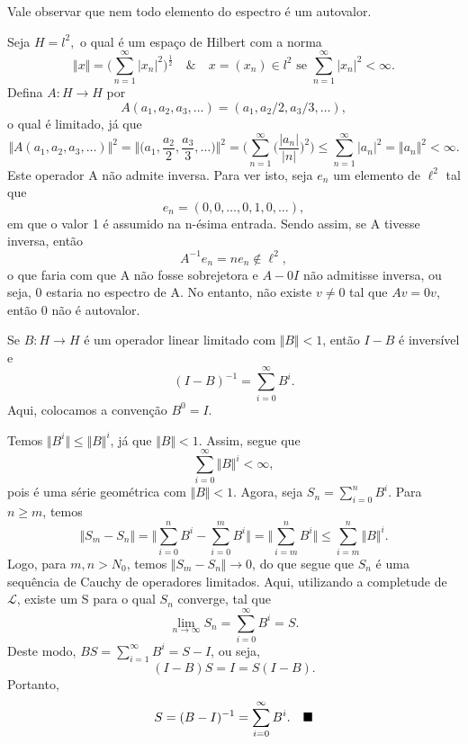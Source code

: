 \documentclass[measure_theory.tex]{subfiles}
\begin{document}
Vale observar que nem todo elemento do espectro é um autovalor.
\begin{example}
	Seja \(H = l^{2},\) o qual é um espaço de Hilbert com a norma
	\[
		\Vert x \Vert = \biggl(\sum\limits_{n=1}^{\infty}|x_{n}|^{2}\biggr)^{\frac{1}{2}}\quad\&\quad x=(x_{n})\in l^{2} \text{ se }\sum\limits_{n=1}^{\infty}|x_{n}|^{2} < \infty.
	\]
	Defina \(A:H\rightarrow H\) por
	\[
		A(a_1, a_2, a_3, \dotsc ) = (a_1, a_2/2, a_3/3, \dotsc ),
	\]
	o qual é limitado, já que
	\[
		\Vert A(a_1, a_2, a_3, \dotsc ) \Vert^{2} = \biggl\Vert \biggl(a_1, \frac{a_2}{2}, \frac{a_3}{3}, \dotsc \biggr)\biggr\Vert^{2} = \biggl(\sum\limits_{n=1}^{\infty}\biggl(\frac{|a_{n}|}{|n|}\biggr)^{2}\biggr) \leq \sum\limits_{n=1}^{\infty}|a_{n}|^{2} = \Vert a_{n} \Vert^{2} < \infty.
	\]
	Este operador A não admite inversa. Para ver isto, seja \(e_{n}\) um elemento de \(\ell^{2}\) tal que
	\[
		e_{n} = (0, 0, \dotsc , 0, 1, 0, \dotsc ),
	\]
	em que o valor 1 é assumido na n-ésima entrada. Sendo assim, se A tivesse inversa, então
	\[
		A^{-1}e_{n} = ne_{n}\not\in \ell^{2},
	\]
	o que faria com que A não fosse sobrejetora e \(A - 0I\) não admitisse inversa, ou seja, 0 estaria no espectro de A. No entanto, não existe \(v\neq 0\) tal que \(Av = 0v\), então 0 não é autovalor.
\end{example}
\begin{prop*}
	Se \(B:H\rightarrow H\) é um operador linear limitado com \(\Vert B \Vert < 1\), então \(I - B\) é inversível e
	\[
		(I-B)^{-1} = \sum\limits_{i=0}^{\infty}B^{i}.
	\]
	Aqui, colocamos a convenção \(B^{0} = I\).
\end{prop*}
\begin{proof*}
	Temos \(\Vert B^{i} \Vert \leq \Vert B \Vert^{i}\), já que \(\Vert B \Vert < 1\). Assim, segue que
	\[
		\sum\limits_{i=0}^{\infty}\Vert B \Vert^{i} < \infty,
	\]
	pois é uma série geométrica com \(\Vert B \Vert < 1.\) Agora, seja \(S_{n} = \sum\limits_{i=0}^{n}B^{i}\). Para \(n\geq m\), temos
	\[
		\Vert S_{m} - S_{n} \Vert = \biggl\Vert \sum\limits_{i=0}^{n}B^{i} - \sum\limits_{i=0}^{m}B^{i}\biggr\Vert = \biggl\Vert \sum\limits_{i=m}^{n}B^{i}\biggr\Vert \leq \sum\limits_{i=m}^{n}\Vert B \Vert^{i}.
	\]
	Logo, para \(m, n > N_{0}\), temos \(\Vert S_{m} - S_{n} \Vert\to 0\), do que segue que \(S_{n}\) é uma sequência de Cauchy de operadores limitados. Aqui, utilizando a completude
	de \(\mathcal{L}\), existe um S para o qual \(S_{n}\) converge, tal que
	\[
		\lim_{n\to \infty}S_{n} = \sum\limits_{i=0}^{\infty}B^{i} = S.
	\]
	Deste modo, \(BS = \sum\limits_{i=1}^{\infty}B^{i} = S - I\), ou seja,
	\[
		(I-B)S = I = S(I-B).
	\]
	Portanto,
	\[
		S = (B-I)^{-1} = \sum\limits_{i=0}^{\infty}B^{i}.\quad \text{$\blacksquare$}
	\]
\end{proof*}
\end{document}
